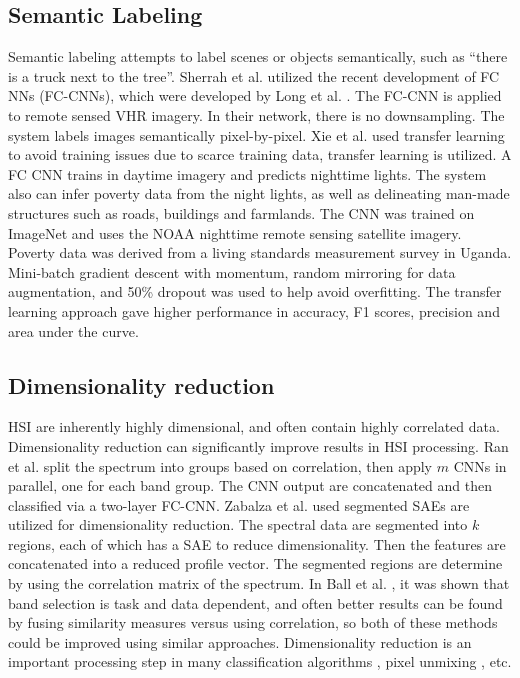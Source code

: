 \documentclass[12pt]{spieman}
\newcommand{\ParSection}[1]{}
\begin{document}
\begin{spacing}{1}
\subsection{Semantic Labeling}

Semantic labeling attempts to label scenes or objects semantically, such as ``there is a truck next to the tree''. Sherrah et al. \cite{sherrah2016fully} utilized the recent development of FC NNs (FC-CNNs), which were developed by Long et al. \cite{long2015fully}. The FC-CNN is applied to remote sensed VHR imagery. In their network, there is no downsampling. The system labels images semantically pixel-by-pixel. Xie et al. \cite{xie2015transfer} used transfer learning to avoid training issues due to scarce training data, transfer learning is utilized. A FC CNN trains in daytime imagery and predicts nighttime lights. The system also can infer poverty data from the night lights, as well as delineating man-made structures such as roads, buildings and farmlands. The CNN was trained on ImageNet and uses the NOAA nighttime remote sensing satellite imagery. Poverty data was derived from a living standards measurement survey in Uganda. Mini-batch gradient descent with momentum, random mirroring for data augmentation, and 50\% dropout was used to help avoid overfitting. The transfer learning approach gave higher performance in accuracy, F1 scores, precision and area under the curve.

\subsection{Dimensionality reduction}
\ParSection{(JOHN-DONE)}

HSI are inherently highly dimensional, and often contain highly correlated data. Dimensionality reduction can significantly improve results in HSI processing. Ran et al. \cite{ran2016bands} split the spectrum into groups based on correlation, then apply $m$ CNNs in parallel, one for each band group. The CNN output are concatenated and then classified via a two-layer FC-CNN. Zabalza et al. \cite{Zabalza2016Novel} used segmented SAEs are utilized for dimensionality reduction. The spectral data are segmented into $k$ regions, each of which has a SAE to reduce dimensionality. Then the features are concatenated into a reduced profile vector. The segmented regions are determine by using the correlation matrix of the spectrum. In Ball et al. \cite{ball2014hyperspectral} , it was shown that band selection is task and data dependent, and often better results can be found by fusing similarity measures versus using correlation, so both of these methods could be improved using similar approaches. Dimensionality reduction is an important processing step in many classification algorithms \cite{Ball2007LevelSetBBA, Ball2007LevelSetSID} , pixel unmixing \cite{keshava2003survey, keshava2002spectral, anderson2012spectral, winter2000comparison, charles2011learning, romero2014unsupervised, ball2007hyperspectral} , etc.


\end{spacing}
\end{document}
